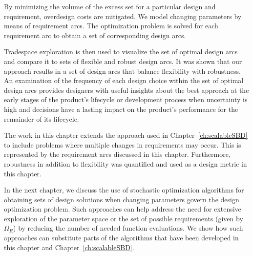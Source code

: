 By minimizing the volume of the excess set for a particular design and requirement, overdesign costs are mitigated. We model changing parameters by means of requirement arcs. The optimization problem is solved for each requirement arc to obtain a set of corresponding design arcs.

Tradespace exploration is then used to visualize the set of optimal design arcs and compare it to sets of flexible and robust design arcs. It was shown that our approach results in a set of design arcs that balance flexibility with robustness. An examination of the frequency of each design choice within the set of optimal design arcs provides designers with useful insights about the best approach at the early stages of the product's lifecycle or development process when uncertainty is high and decisions have a lasting impact on the product's performance for the remainder of its lifecycle.

The work in this chapter extends the approach used in Chapter~\ref{ch:scalableSBD} to include problems where multiple changes in requirements may occur. This is represented by the requirement arcs discussed in this chapter. Furthermore, robustness in addition to flexibility was quantified and used as a design metric in this chapter.

In the next chapter, we discuss the use of stochastic optimization algorithms for obtaining sets of design solutions when changing parameters govern the design optimization problem. Such approaches can help address the need for extensive exploration of the parameter space or the set of possible requirements (given by $\Omega_R$) by reducing the number of needed function evaluations. We show how such approaches can substitute parts of the algorithms that have been developed in this chapter and Chapter~\ref{ch:scalableSBD}.